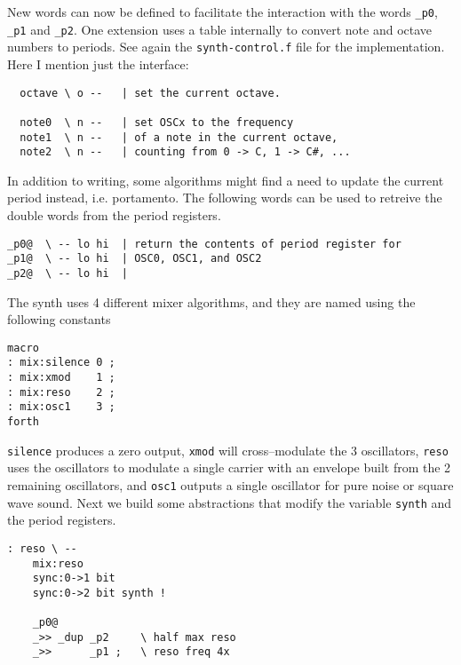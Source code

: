 \documentclass[12pt]{article}
\begin{document}
New words can now be defined to facilitate the interaction with the
words \verb|_p0|, \verb|_p1| and \verb|_p2|. One extension uses a table
internally to convert note and octave numbers to periods. See again
the \verb|synth-control.f| file for the implementation. Here I mention
just the interface:
\begin{verbatim}
  octave \ o --   | set the current octave.

  note0  \ n --   | set OSCx to the frequency 
  note1  \ n --   | of a note in the current octave,
  note2  \ n --   | counting from 0 -> C, 1 -> C#, ...
\end{verbatim}

In addition to writing, some algorithms might find a need to update
the current period instead, i.e. portamento. The following words can
be used to retreive the double words from the period registers.
\begin{verbatim}
_p0@  \ -- lo hi  | return the contents of period register for
_p1@  \ -- lo hi  | OSC0, OSC1, and OSC2
_p2@  \ -- lo hi  |
\end{verbatim}

The synth uses 4 different mixer algorithms, and they are named using
the following constants
\begin{verbatim}
macro  
: mix:silence 0 ;
: mix:xmod    1 ;
: mix:reso    2 ;
: mix:osc1    3 ;
forth    
\end{verbatim}
\verb|silence| produces a zero output, \verb|xmod| will
cross--modulate the 3 oscillators, \verb|reso| uses the oscillators to
modulate a single carrier with an envelope built from the 2 remaining
oscillators, and \verb|osc1| outputs a single oscillator for pure
noise or square wave sound. Next we build some abstractions that
modify the variable \verb|synth| and the period registers.
\begin{samepage}
\begin{verbatim}
: reso \ --
    mix:reso
    sync:0->1 bit
    sync:0->2 bit synth !

    _p0@ 
    _>> _dup _p2     \ half max reso
    _>>      _p1 ;   \ reso freq 4x
\end{verbatim}
\end{samepage}
\end{document}

